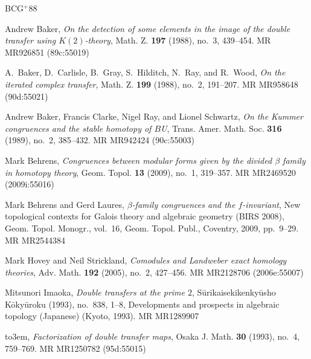 \documentclass[10pt,a4paper]{amsart}
\theoremstyle{definition}
\theoremstyle{remark}
\begin{document}
%
%
\newcommand{\etalchar}[1]{$^{#1}$}
\providecommand{\bysame}{\leavevmode\hbox to3em{\hrulefill}\thinspace}
\providecommand{\MR}{\relax\ifhmode\unskip\space\fi MR }
\providecommand{\MRhref}[2]{%
  \href{http://www.ams.org/mathscinet-getitem?mr=#1}{#2}
}
\providecommand{\href}[2]{#2}
\begin{thebibliography}{BCG{\etalchar{+}}88}

Andrew Baker, \emph{On the detection of some elements in the image of the
  double transfer using {$K(2)$}-theory}, Math. Z. \textbf{197} (1988), no.~3,
  439--454. \MR{MR926851 (89c:55019)}

\bibitem[BCG{\etalchar{+}}88]{BCGHRW}
A.~Baker, D.~Carlisle, B.~Gray, S.~Hilditch, N.~Ray, and R.~Wood, \emph{On the
  iterated complex transfer}, Math. Z. \textbf{199} (1988), no.~2, 191--207.
  \MR{MR958648 (90d:55021)}

Andrew Baker, Francis Clarke, Nigel Ray, and Lionel Schwartz, \emph{On the
  {K}ummer congruences and the stable homotopy of {$B$}{U}}, Trans. Amer. Math.
  Soc. \textbf{316} (1989), no.~2, 385--432. \MR{MR942424 (90c:55003)}

Mark Behrens, \emph{Congruences between modular forms given by the divided
  {$\beta$} family in homotopy theory}, Geom. Topol. \textbf{13} (2009), no.~1,
  319--357. \MR{MR2469520 (2009i:55016)}

Mark Behrens and Gerd Laures, \emph{{$\beta$}-family congruences and the
  {$f$}-invariant}, New topological contexts for {G}alois theory and algebraic
  geometry ({BIRS} 2008), Geom. Topol. Monogr., vol.~16, Geom. Topol. Publ.,
  Coventry, 2009, pp.~9--29. \MR{MR2544384}

Mark Hovey and Neil Strickland, \emph{Comodules and {L}andweber exact homology
  theories}, Adv. Math. \textbf{192} (2005), no.~2, 427--456. \MR{MR2128706
  (2006e:55007)}

Mitsunori Imaoka, \emph{Double transfers at the prime {$2$}},
  S\=urikaisekikenky\=usho K\=oky\=uroku (1993), no.~838, 1--8, Developments
  and prospects in algebraic topology (Japanese) (Kyoto, 1993). \MR{MR1289907}

\bysame, \emph{Factorization of double transfer maps}, Osaka J. Math.
  \textbf{30} (1993), no.~4, 759--769. \MR{MR1250782 (95d:55015)}


\end{thebibliography}
\end{document}
